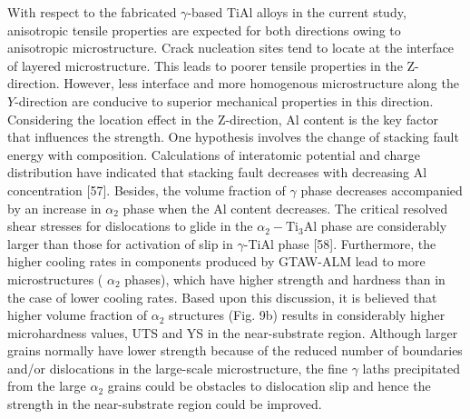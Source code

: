 \documentclass[10pt]{article}
\begin{document}
With respect to the fabricated $\gamma$-based TiAl alloys in the current study, anisotropic tensile properties are expected for both directions owing to anisotropic microstructure. Crack nucleation sites tend to locate at the interface of layered microstructure. This leads to poorer tensile properties in the Z-direction. However, less interface and more homogenous microstructure along the $Y$-direction are conducive to superior mechanical properties in this direction. Considering the location effect in the Z-direction, Al content is the key factor that influences the strength. One hypothesis involves the change of stacking fault energy with composition. Calculations of interatomic potential and charge distribution have indicated that stacking fault decreases with decreasing Al concentration [57]. Besides, the volume fraction of $\gamma$ phase decreases accompanied by an increase in $\alpha_{2}$ phase when the Al content decreases. The critical resolved shear stresses for dislocations to glide in the $\alpha_{2}-\mathrm{Ti}_{3} \mathrm{Al}$ phase are considerably larger than those for activation of slip in $\gamma$-TiAl phase [58]. Furthermore, the higher cooling rates in components produced by GTAW-ALM lead to more microstructures ( $\alpha_{2}$ phases), which have higher strength and hardness than in the case of lower cooling rates. Based upon this discussion, it is believed that higher volume fraction of $\alpha_{2}$ structures (Fig. 9b) results in considerably higher microhardness values, UTS and YS in the near-substrate region. Although larger grains normally have lower strength because of the reduced number of boundaries and/or dislocations in the large-scale microstructure, the fine $\gamma$ laths precipitated from the large $\alpha_{2}$ grains could be obstacles to dislocation slip and hence the strength in the near-substrate region could be improved.
\end{document}
